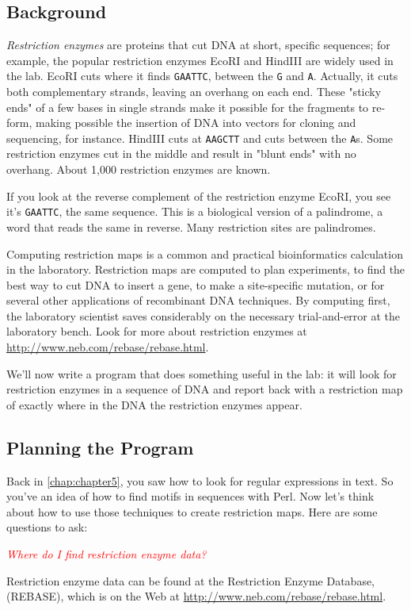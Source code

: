 \subsection{Background}
\textit{Restriction enzymes} are proteins that cut DNA at short, specific sequences; for example, the popular restriction enzymes EcoRI and HindIII are widely used in the lab. EcoRI cuts where it finds \verb|GAATTC|, between the \verb|G| and \verb|A|. Actually, it cuts both complementary strands, leaving an overhang on each end. These "sticky ends" of a few bases in single strands make it possible for the fragments to re-form, making possible the insertion of DNA into vectors for cloning and sequencing, for instance. HindIII cuts at \verb|AAGCTT| and cuts between the \verb|A|s. Some restriction enzymes cut in the middle and result in "blunt ends" with no overhang. About 1,000 restriction enzymes are known. 

If you look at the reverse complement of the restriction enzyme EcoRI, you see it's \verb|GAATTC|, the same sequence. This is a biological version of a palindrome, a word that reads the same in reverse. Many restriction sites are palindromes.

Computing restriction maps is a common and practical bioinformatics calculation in the laboratory. Restriction maps are computed to plan experiments, to find the best way to cut DNA to insert a gene, to make a site-specific mutation, or for several other applications of recombinant DNA techniques. By computing first, the laboratory scientist saves considerably on the necessary trial-and-error at the laboratory bench. Look for more about restriction enzymes at \href{http://www.neb.com/rebase/rebase.html}{http://www.neb.com/rebase/rebase.html}.

We'll now write a program that does something useful in the lab: it will look for restriction enzymes in a sequence of DNA and report back with a restriction map of exactly where in the DNA the restriction enzymes appear. 

\subsection{Planning the Program}
Back in \autoref{chap:chapter5}, you saw how to look for regular expressions in text. So you've an idea of how to find motifs in sequences with Perl. Now let's think about how to use those techniques to create restriction maps. Here are some questions to ask:

\textcolor{red}{\textit{Where do I find restriction enzyme data?}}
\begin{adjustwidth}{1cm}{}
Restriction enzyme data can be found at the Restriction Enzyme Database, (REBASE), which is on the Web at \href{http://www.neb.com/rebase/rebase.html}{http://www.neb.com/rebase/rebase.html}.
\end{adjustwidth}

